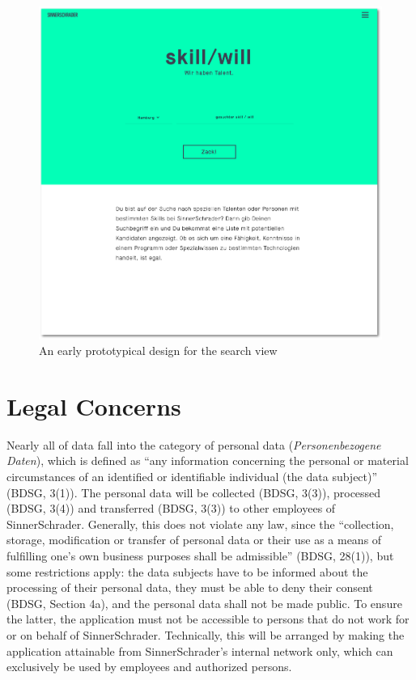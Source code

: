 \newpage
\begin{figure}[hp]
    \centering
    \includegraphics[width=\textwidth]{images/design_home.png}
    \caption[Illustration: Search Page (Concept)]{An early prototypical design for the search view}
    \label{fig:design_home}
\end{figure}
\newpage

\section{Legal Concerns}
Nearly all of data fall into the category of personal data (\textit{Personenbezogene Daten}), which is defined as ``any information concerning the personal or material circumstances of an identified or identifiable individual (the data subject)'' (BDSG, 3(1)). The personal data will be collected (BDSG, 3(3)), processed (BDSG, 3(4)) and transferred (BDSG, 3(3)) to other employees of SinnerSchrader.
Generally, this does not violate any law, since the ``collection, storage, modification or transfer of personal data or their use as a means of fulfilling one’s own business purposes shall be admissible'' (BDSG, 28(1)), but some restrictions apply: the data subjects have to be informed about the processing of their personal data, they must be able to deny their consent (BDSG, Section 4a), and the personal data shall not be made public.
To ensure the latter, the application must not be accessible to persons that do not work for or on behalf of SinnerSchrader. Technically, this will be arranged by making the application attainable from SinnerSchrader's internal network only, which can exclusively be used by employees and authorized persons.

